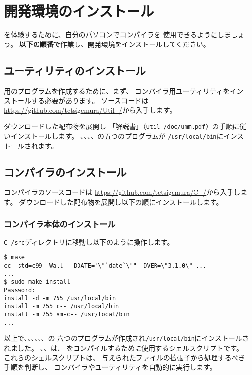 % 
%
\chapter{\cmml 開発環境のインストール}

\cmml を体験するために、自分のパソコンで\cmm コンパイラを
使用できるようにしましょう。
{\bf 以下の順番で}作業し、開発環境をインストールしてください。


\section{ユーティリティのインストール}

{\tac}用のプログラムを作成するために、まず、
{\cmm}コンパイラ用ユーティリティをインストールする必要があります。
ソースコードは
\url{https://github.com/tctsigemura/Util--/}から入手します。

ダウンロードした配布物を展開し
「{\util}解説書」（{\tt Util--/doc/umm.pdf}）の手順に従いインストールします。
{\as}、{\ld}、{\objbin}、{\objexe}、{\size}の五つのプログラムが
{\tt /usr/local/bin}にインストールされます。

\section{コンパイラのインストール}
\label{chap2:compilerl}

{\cmm}コンパイラのソースコードは
\url{https://github.com/tctsigemura/C--/}から入手します。
ダウンロードした配布物を展開し以下の順にインストールします。

\subsection{コンパイラ本体のインストール}

{\tt C--/src}ディレクトリに移動し以下のように操作します。

\begin{mylist}
\begin{verbatim}
$ make
cc -std=c99 -Wall  -DDATE="\"`date`\"" -DVER=\"3.1.0\" ...
...
$ sudo make install
Password:
install -d -m 755 /usr/local/bin
install -m 755 c-- /usr/local/bin
install -m 755 vm-c-- /usr/local/bin
...
\end{verbatim}
\end{mylist}

以上で、{\cme}、{\cmc}、{\cmv}、{\cmmc}、{\vcmmc}、{\ccmmc}の
六つのプログラムが作成され\verb;/usr/local/bin;にインストールされました。
{\cme}、{\cmc}、{\cmv}は、
{\cmml}をコンパイルするために使用するシェルスクリプトです。
これらのシェルスクリプトは、
与えられたファイルの拡張子から処理するべき手順を判断し、
コンパイラやユーティリティを自動的に実行します。

